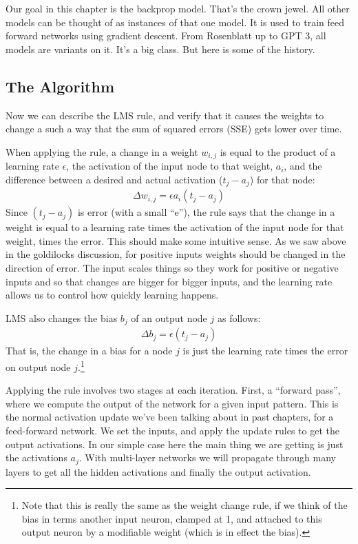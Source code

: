 Our goal in this chapter is the backprop model. That's the crown jewel. All other models can be thought of as instances of that one model. It is used to train feed forward networks using gradient descent. From Rosenblatt up to GPT 3, all models are variants on it. It's a big class. But here is some of the history.

\subsection{The Algorithm}

Now we can describe the LMS rule, and verify that it causes the weights to change a such a way that the sum of squared errors (SSE) gets lower over time.

When applying the rule, a change in a weight $w_{i,j}$ is equal to the product of a learning rate $\epsilon$, the activation of the input node to that weight, $a_i$, and the difference between a desired and actual activation ($t_j - a_j$) for that node:
\begin{eqnarray*}
\Delta w_{i,j}  =  \epsilon a_i (t_j - a_j)
\end{eqnarray*}
Since $(t_j - a_j)$ is error  (with a small ``e''), the rule says that the change in a weight is equal to a learning rate times the activation of the input node for that weight, times the error. This should make some intuitive sense. As we saw above in the goldilocks discussion, for positive inputs weights should be changed in the direction of error. The input scales things so they work for positive or negative inputs and so that changes are bigger for bigger inputs, and the learning rate allows us to control how quickly learning happens. 

LMS also changes the bias $b_j$ of an output node $j$ as follows: 
\begin{eqnarray*}
\Delta b_j  =  \epsilon (t_j - a_j)
\end{eqnarray*}
That is, the change in a bias for a node $j$ is just the learning rate times the error on output node $j$.\footnote{Note that this is really the same as the weight change rule, if we think of the bias in terms another input neuron, clamped at 1, and attached to this output neuron by a modifiable weight (which is in effect the bias).}

Applying the rule involves two stages at each iteration. First, a ``forward pass'', where we compute the output of the network for a given input pattern. This is the normal activation update we've been talking about in past chapters, for a feed-forward network. We set the inputs, and apply the update rules to get the output activations. In our simple case here the main thing we are getting is just the activations $a_j$.  With multi-layer  networks we will propagate through many layers to get all the hidden activations and finally the output activation. 

